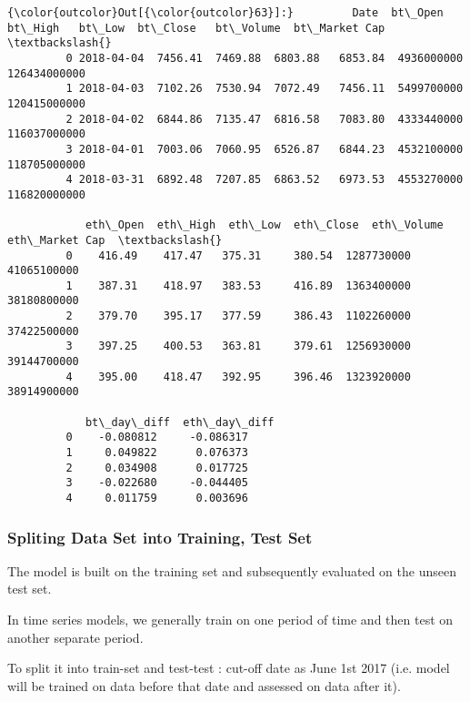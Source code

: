 \documentclass[11pt]{article}
\begin{document}
\begin{Verbatim}[commandchars=\\\{\}]
{\color{outcolor}Out[{\color{outcolor}63}]:}         Date  bt\_Open  bt\_High   bt\_Low  bt\_Close   bt\_Volume  bt\_Market Cap  \textbackslash{}
         0 2018-04-04  7456.41  7469.88  6803.88   6853.84  4936000000   126434000000   
         1 2018-04-03  7102.26  7530.94  7072.49   7456.11  5499700000   120415000000   
         2 2018-04-02  6844.86  7135.47  6816.58   7083.80  4333440000   116037000000   
         3 2018-04-01  7003.06  7060.95  6526.87   6844.23  4532100000   118705000000   
         4 2018-03-31  6892.48  7207.85  6863.52   6973.53  4553270000   116820000000   
         
            eth\_Open  eth\_High  eth\_Low  eth\_Close  eth\_Volume eth\_Market Cap  \textbackslash{}
         0    416.49    417.47   375.31     380.54  1287730000    41065100000   
         1    387.31    418.97   383.53     416.89  1363400000    38180800000   
         2    379.70    395.17   377.59     386.43  1102260000    37422500000   
         3    397.25    400.53   363.81     379.61  1256930000    39144700000   
         4    395.00    418.47   392.95     396.46  1323920000    38914900000   
         
            bt\_day\_diff  eth\_day\_diff  
         0    -0.080812     -0.086317  
         1     0.049822      0.076373  
         2     0.034908      0.017725  
         3    -0.022680     -0.044405  
         4     0.011759      0.003696  
\end{Verbatim}
            
    \subsubsection{Spliting Data Set into Training, Test
Set}\label{spliting-data-set-into-training-test-set}

The model is built on the training set and subsequently evaluated on the
unseen test set.

In time series models, we generally train on one period of time and then
test on another separate period.

To split it into train-set and test-test : cut-off date as June 1st 2017
(i.e. model will be trained on data before that date and assessed on
data after it).
\end{document}
